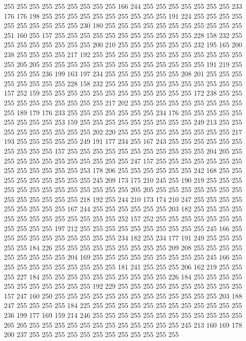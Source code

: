 255 255 255 255 255 255 255 255 255 166 244 255 255 255 255 255 255 255 233 176
176 198 255 255 255 255 255 255 255 255 255 255 191 224 255 255 255 255 255 255
255 255 255 255 230 180 255 255 255 255 255 255 255 255 255 255 255 251 160 255
157 255 255 255 255 255 255 255 255 255 255 255 228 158 232 255 255 255 255 255
255 255 255 200 210 255 255 255 255 255 255 232 195 165 200 238 255 255 255 255
217 192 255 255 255 255 255 255 255 255 255 255 255 255 255 205 205 255 255 255
255 255 255 255 255 255 255 255 255 255 191 219 255 255 255 255 236 199 163 197
234 255 255 255 255 255 255 208 201 255 255 255 255 255 255 255 255 228 158 232
255 255 255 255 255 255 255 255 255 255 255 157 252 159 255 255 255 255 255 255
255 255 255 255 255 255 172 238 255 255 255 255 255 255 255 255 255 255 217 202
255 255 255 255 255 255 255 255 255 255 189 179 176 233 255 255 255 255 255 255
255 234 176 255 255 255 255 255 255 255 255 255 253 159 255 255 255 255 255 255
255 255 255 249 213 255 255 255 255 255 255 255 255 255 202 220 255 255 255 255
255 255 255 255 255 217 193 255 255 255 255 255 249 191 177 234 255 167 243 255
255 255 255 255 255 255 255 255 255 157 255 255 255 255 255 255 255 255 255 255
255 204 205 255 255 255 255 255 255 255 255 255 255 255 247 157 255 255 255 255
255 255 255 255 255 255 255 255 255 253 178 206 255 255 255 255 255 255 242 168
255 255 255 255 255 255 255 255 255 245 209 173 175 210 245 255 190 219 255 255
255 255 255 255 255 255 255 255 255 255 255 205 205 255 255 255 255 255 255 255
255 255 255 255 255 255 218 192 255 244 210 173 174 210 247 255 255 255 255 255
255 255 255 255 167 244 255 255 255 255 255 255 203 182 255 255 255 255 255 255
255 255 255 255 255 255 255 252 157 252 255 255 255 255 255 255 255 255 255 255
255 197 212 255 255 255 255 255 255 255 255 255 255 245 166 255 255 255 255 255
255 255 255 255 255 234 182 255 234 177 191 249 255 255 255 255 255 184 226 255
255 255 255 255 255 255 255 255 209 208 255 255 255 255 255 255 255 255 255 204
169 255 255 255 255 255 255 255 255 255 245 166 255 255 255 255 255 255 255 255
255 255 181 241 255 255 255 206 162 219 255 255 255 227 184 255 255 255 255 255
255 255 255 255 255 226 184 255 255 255 255 255 255 255 255 255 255 255 192 229
255 255 255 255 255 255 255 255 255 255 157 247 160 250 255 255 255 255 255 255
255 255 255 255 255 255 255 203 188 247 255 255 255 255 184 225 255 255 255 255
255 255 255 255 255 255 255 255 236 199 177 169 159 214 246 255 255 255 255 255
255 255 255 255 255 255 255 205 205 255 255 255 255 255 255 255 255 255 255 255
255 245 213 160 169 178 200 237 255 255 255 255 255 255 255 255 255 255 255 255
